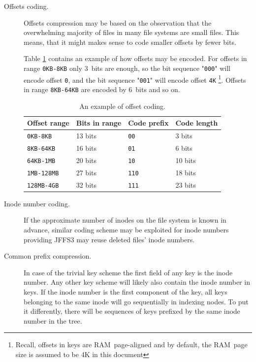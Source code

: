 \begin{description}

\item[Offsets coding.] Offsets compression may be based on the observation that
the overwhelming majority of files in many file systems are small files. This
means, that it might makes sense to code smaller offsets by fewer bits.

Table \ref{ref_TableOffsCodes} contains an example of how offsets may be
encoded. For offsets in range \texttt{0KB-8KB} only 3~bits are enough, so the
bit sequence "\texttt{000}" will encode offset \texttt{0}, and the bit sequence
"\texttt{001}" will encode offset \texttt{4K} \footnote{Recall, offsets in keys
are \mbox{RAM page-aligned} and by default, the RAM~page size is assumed to be
4K in this document}. Offsets in range \texttt{8KB-64KB} are encoded by 6~bits
and so on.

\begin{table}[h]
\begin{center}
\begin{tabular}{llll}
\textbf{Offset range} & \textbf{Bits in range} & \textbf{Code prefix} & \textbf{Code length}\\
\hline
\texttt{0KB-8KB}   & 13 bits & \texttt{00}  & 3 bits\\
\texttt{8KB-64KB}  & 16 bits & \texttt{01}  & 6 bits\\
\texttt{64KB-1MB}  & 20 bits & \texttt{10}  & 10 bits\\
\texttt{1MB-128MB} & 27 bits & \texttt{110} & 18 bits\\
\texttt{128MB-4GB} & 32 bits & \texttt{111} & 23 bits\\
\end{tabular}
\caption{An example of offset coding.}
\label{ref_TableOffsCodes}
\end{center}
\end{table}

\item[Inode number coding.] If the approximate number of inodes on the
file system is known in advance, similar coding scheme may be exploited for
inode numbers providing JFFS3 may reuse deleted files' inode numbers.

\item[Common prefix compression.] In case of the trivial key scheme the first
field of any key is the inode number. Any other key scheme will likely also
contain the inode number in keys. If the inode number is the first component of
the key, all keys belonging to the same inode will go sequentially in indexing
nodes. To put it differently, there will be sequences of keys prefixed by the
same inode number in the tree.


\end{description}
